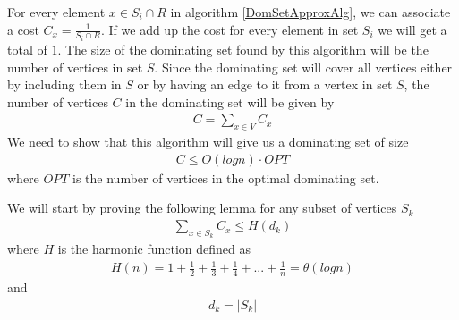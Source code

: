 \documentclass[paper=a4, fontsize=11pt]{scrartcl} %
\numberwithin{figure}{section} %
\numberwithin{table}{section} %
\begin{document}
\begin{enumerate}
For every element $x \in S_i \cap R$ in algorithm \ref{DomSetApproxAlg}, we can associate a cost $C_x = \frac{1}{S_i \cap R}$. If we add up the cost for every element in set $S_i$ we will get a total of $1$. The size of the dominating set found by this algorithm will be the number of vertices in set $S$. Since the dominating set will cover all vertices either by including them in $S$ or by having an edge to it from a vertex in set $S$, the number of vertices $C$ in the dominating set will be given by
\begin{align*} 
C = \sum \limits_{x \in V} C_x
\end{align*}
 We need to show that this algorithm will give us a dominating set of size 
\begin{align*} 
C \leq O(log n) \cdot OPT 
\end{align*}
where $OPT$ is the number of vertices in the optimal dominating set.

We will start by proving the following lemma for any subset of vertices $S_k$
\begin{align} \label{lemma}
\sum \limits_{x \in S_k} C_x \leq H(d_k) 
\end{align}
where $H$ is the harmonic function defined as
\begin{align} \label{HarmonicFunction}
H(n) = 1 + \frac{1}{2} + \frac{1}{3}+ \frac{1}{4} + ... + \frac{1}{n} = \theta (log n)
\end{align}and 
\begin{align*} 
d_k = \left | S_k \right | 
\end{align*}


\end{enumerate}
\end{document}
